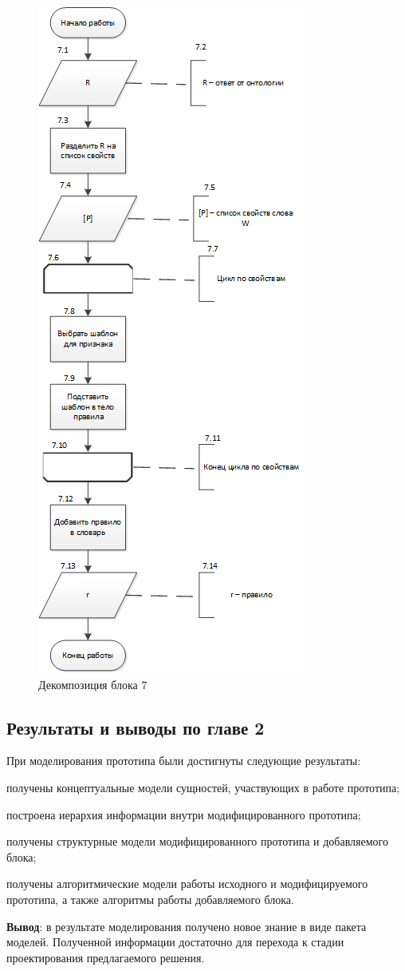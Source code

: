 \begin{figure}[H]
	\centering
		\includegraphics[scale=1.0]{images/decomposedalgorithm2.png}
	\caption{\small Декомпозиция блока 7}
	\label{fig:decomposedalgorithm2}
\end{figure}

\subsection{Результаты и выводы по главе 2}

При моделирования прототипа были достигнуты следующие результаты:
\begin{list}{}{\leftmargin=1.5cm}
	\item получены концептуальные модели сущностей, участвующих в работе прототипа;
	\item построена иерархия информации внутри модифицированного прототипа;
	\item получены структурные модели модифицированного прототипа и добавляемого блока;
	\item получены алгоритмические модели работы исходного и модифицируемого прототипа, а также алгоритмы работы добавляемого блока.
\end{list}

\textbf{Вывод}: в результате моделирования получено новое знание в виде пакета моделей. Полученной информации достаточно для перехода к стадии проектирования предлагаемого решения.
